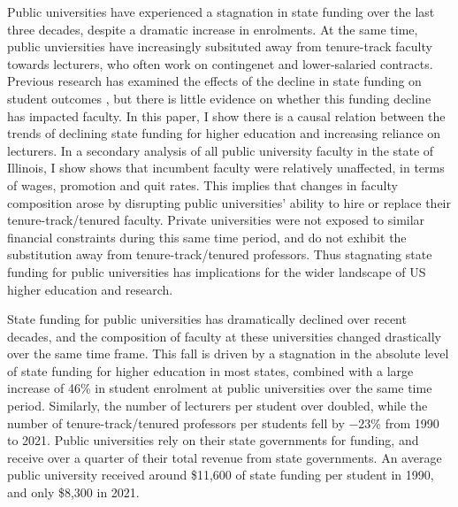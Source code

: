 Public universities have experienced a stagnation in state funding over the last three decades, despite a dramatic increase in enrolments.
At the same time, public unviersities have increasingly subsituted away from tenure-track faculty towards lecturers, who often work on contingenet and lower-salaried contracts.
Previous research has examined the effects of the decline in state funding on student outcomes \citep{NBERw23736,NBERw27885}, but there is little evidence on whether this funding decline has impacted faculty.
In this paper, I show there is a causal relation between the trends of declining state funding for higher education and increasing reliance on lecturers.
In a secondary analysis of all public university faculty in the state of Illinois, I show  shows that incumbent faculty were relatively unaffected, in terms of wages, promotion and quit rates.
This implies that changes in faculty composition arose by disrupting public universities' ability to hire or replace their tenure-track/tenured faculty. 
Private universities were not exposed to similar financial constraints during this same time period, and do not exhibit the substitution away from tenure-track/tenured professors.
Thus stagnating state funding for public universities has implications for the wider landscape of US higher education and research.

State funding for public universities has dramatically declined over recent decades, and the composition of faculty at these universities changed drastically over the same time frame.
This fall is driven by a stagnation in the absolute level of state funding for higher education in most states, combined with a large increase of 46\% in student enrolment at public universities over the same time period.
Similarly, the number of lecturers per student over doubled, while the number of tenure-track/tenured professors per students fell by $-23$\% from 1990 to 2021.
Public universities rely on their state governments for funding, and receive over a quarter of their total revenue from state governments.
An average public university received around \$11,600 of state funding per student in 1990, and only \$8,300 in 2021.

